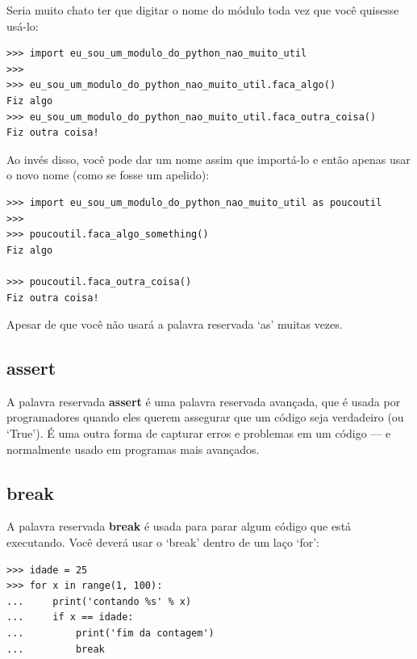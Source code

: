 \noindent
Seria muito chato ter que digitar o nome do módulo toda vez que você quisesse usá-lo:

\begin{listingignore}
\begin{verbatim}
>>> import eu_sou_um_modulo_do_python_nao_muito_util
>>>
>>> eu_sou_um_modulo_do_python_nao_muito_util.faca_algo()
Fiz algo
>>> eu_sou_um_modulo_do_python_nao_muito_util.faca_outra_coisa()
Fiz outra coisa!
\end{verbatim}
\end{listingignore}

\noindent
Ao invés disso, você pode dar um nome assim que importá-lo e então apenas usar o novo nome (como se fosse um apelido):

\begin{listingignore}
\begin{verbatim}
>>> import eu_sou_um_modulo_do_python_nao_muito_util as poucoutil
>>>
>>> poucoutil.faca_algo_something()
Fiz algo

>>> poucoutil.faca_outra_coisa()
Fiz outra coisa!
\end{verbatim}
\end{listingignore}

\noindent
Apesar de que você não usará a palavra reservada `as' muitas vezes.

\subsection*{assert}

A palavra reservada \textbf{assert} é uma palavra reservada avançada, que é usada por programadores quando eles querem assegurar que um código seja verdadeiro (ou `True'). É uma outra forma de capturar erros e problemas em um código --- e normalmente usado em programas mais avançados.

\subsection*{break}

A palavra reservada \textbf{break} é usada para parar algum código que está executando. Você deverá usar o `break' dentro de um laço `for':

\begin{listing}
\begin{verbatim}
>>> idade = 25
>>> for x in range(1, 100):
...     print('contando %s' % x)
...     if x == idade:
...         print('fim da contagem')
...         break
\end{verbatim}
\end{listing}

